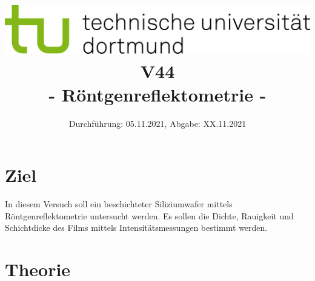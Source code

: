 
\usepackage{romannum}
\usepackage{listings}
\lstset{numbers=left, numberstyle=\tiny, numbersep=5pt}
\lstset{language=Perl}

\title{\includegraphics[scale=0.8]{../logo.jpg} \\ \vspace*{1cm} V44 \\ - Röntgenreflektometrie -}

\date{Durchführung: 05.11.2021, Abgabe: XX.11.2021}



\maketitle

\tableofcontents
\newpage

\section{Ziel}
In diesem Versuch soll ein beschichteter Siliziumwafer mittels Röntgenreflektometrie untersucht werden. Es sollen die Dichte, Rauigkeit und Schichtdicke des Films mittels Intensitätsmessungen bestimmt werden. %

\section{Theorie}
\label{sec:theorie}

